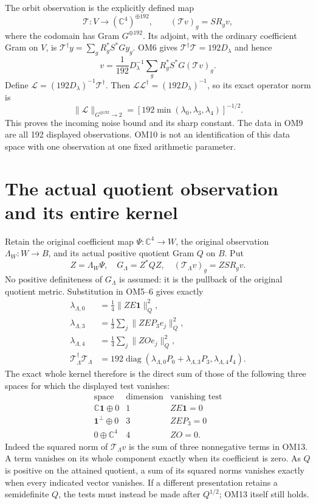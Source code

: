 \documentclass[11pt]{article}
\newcommand{\C}{\mathbb C}
\newcommand{\diag}{\operatorname{diag}}
\newcommand{\one}{\mathbf 1}
\begin{document}
The orbit observation is the explicitly defined map
\[
\mathcal T:V\longrightarrow(\C^4)^{\oplus192},\qquad
(\mathcal Tv)_g=S R_gv,
\tag{OM9}
\]
where the codomain has Gram $G^{\oplus192}$.  Its adjoint, with the
ordinary coefficient Gram on $V$, is
$\mathcal T^\dagger y=\sum_g R_g^*S^*G y_g$.
OM6 gives $\mathcal T^\dagger\mathcal T=192D_\lambda$ and hence
\[
v=\frac1{192}D_\lambda^{-1}\sum_gR_g^*S^*G(\mathcal Tv)_g.
\tag{OM10}
\]
Define $\mathcal L=(192D_\lambda)^{-1}\mathcal T^\dagger$.
Then
$\mathcal L\mathcal L^\dagger=(192D_\lambda)^{-1}$, so its exact
operator norm is
\[
\|\mathcal L\|_{G^{\oplus192}\to2}
=[192\min(\lambda_0,\lambda_3,\lambda_4)]^{-1/2}.
\tag{OM11}
\]
This proves the incoming noise bound and its sharp constant.
The data in OM9 are all 192 displayed observations.  OM10 is not
an identification of this data space with one observation at one
fixed arithmetic parameter.

\section{The actual quotient observation and its entire kernel}
Retain the original coefficient map $\Psi:\C^4\to W$, the original
observation $\Lambda_W:W\to B$, and its actual positive quotient
Gram $Q$ on $B$.  Put
\[
Z=\Lambda_W\Psi,\quad G_\Lambda=Z^*QZ,\quad
(\mathcal T_\Lambda v)_g=ZS R_gv.
\tag{OM12}
\]
No positive definiteness of $G_\Lambda$ is assumed: it is the
pullback of the original quotient metric.  Substitution in OM5--6
gives exactly
\[
\begin{split}
\lambda_{\Lambda,0}&=\tfrac14\|ZE\one\|_Q^2,\\
\lambda_{\Lambda,3}&=\tfrac13\sum_j\|ZE P_3e_j\|_Q^2,\\
\lambda_{\Lambda,4}&=\tfrac14\sum_j\|ZO e_j\|_Q^2,\\
\mathcal T_\Lambda^\dagger\mathcal T_\Lambda
&=192\diag(\lambda_{\Lambda,0}P_0+
\lambda_{\Lambda,3}P_3,\lambda_{\Lambda,4}I_4).
\end{split}\tag{OM13}
\]
The exact whole kernel therefore is the direct sum of those of the
following three spaces for which the displayed test vanishes:
\[
\begin{array}{c|c|c}
\text{space}&\text{dimension}&\text{vanishing test}\\ \hline
\C\one\oplus0&1&ZE\one=0\\
\one^\perp\oplus0&3&ZE P_3=0\\
0\oplus\C^4&4&ZO=0 .
\end{array}\tag{OM14}
\]
Indeed the squared norm of $\mathcal T_\Lambda v$ is the sum of
three nonnegative terms in OM13.  A term vanishes on its whole
component exactly when its coefficient is zero.  As $Q$ is
positive on the attained quotient, a sum of its squared norms
vanishes exactly when every indicated vector vanishes.
If a different presentation retains a semidefinite $Q$, the tests
must instead be made after $Q^{1/2}$; OM13 itself still holds.
\end{document}

